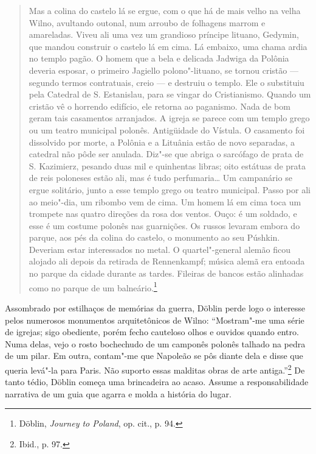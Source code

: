 \begin{quote}
Mas a colina do castelo lá se ergue, com o que há de mais velho na velha
Wilno, avultando outonal, num arroubo de folhagens marrom e amareladas.
Viveu ali uma vez um grandioso príncipe lituano, Gedymin, que mandou
construir o castelo lá em cima. Lá embaixo, uma chama ardia no templo
pagão. O homem que a bela e delicada Jadwiga da Polônia deveria esposar,
o primeiro Jagiello polono"-lituano, se tornou cristão --- segundo termos
contratuais, creio --- e destruiu o templo. Ele o substituiu pela Catedral
de S. Estanislau, para se vingar do Cristianismo. Quando um cristão vê o
horrendo edifício, ele retorna ao paganismo. Nada de bom geram tais
casamentos arranjados. A igreja se parece com um templo grego ou um
teatro municipal polonês. Antigüidade do Vístula. O casamento foi
dissolvido por morte, a Polônia e a Lituânia estão de novo separadas, a
catedral não pôde ser anulada. Diz"-se que abriga o sarcófago de prata de
S. Kazimierz, pesando duas mil e quinhentas libras; oito estátuas de
prata de reis poloneses estão ali, mas é tudo perfumaria\ldots{} Um
campanário se ergue solitário, junto a esse templo grego ou teatro
municipal. Passo por ali ao meio"-dia, um ribombo vem de cima. Um homem
lá em cima toca um trompete nas quatro direções da rosa dos ventos.
Ouço: é um soldado, e esse é um costume polonês nas guarnições. Os
russos levaram embora do parque, aos pés da colina do castelo, o
monumento ao seu Púshkin. Deveriam estar interessados no metal. O
quartel"-general alemão ficou alojado ali depois da retirada de
Rennenkampf; música alemã era entoada no parque da cidade durante as
tardes. Fileiras de bancos estão alinhadas como no parque de um
balneário.\footnote{Döblin, \emph{Journey to Poland}, op. cit., p. 94.}
\end{quote}

%

Assombrado por estilhaços de memórias da guerra, Döblin perde logo o
interesse pelos numerosos monumentos arquitetônicos de Wilno:
``Mostram"-me uma série de igrejas; sigo obediente, porém fecho cauteloso
olhos e ouvidos quando entro. Numa delas, vejo o rosto bochechudo de um
camponês polonês talhado na pedra de um pilar. Em outra, contam"-me que
Napoleão se pôs diante dela e disse que queria levá"-la para Paris. Não
suporto essas malditas obras de arte antiga.''\footnote{Ibid., p. 97.}
De tanto tédio, Döblin começa uma brincadeira ao acaso. Assume a
responsabilidade narrativa de um guia que agarra e molda a história do
lugar.


